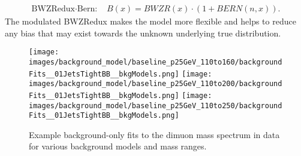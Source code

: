 \begin{align}
        \label{eq:BWZReduxPoly}
        \text{BWZRedux}\cdot\text{Bern: }& {B(x)} = BWZR(x) \cdot \left(1+ BERN(n,x)\right).
\end{align}
The modulated BWZRedux makes the model more flexible and helps to reduce any bias that may exist towards the unknown underlying true distribution.
\begin{figure}[hbp]
     \centering
     \texttt{[image: images/background\_model/baseline\_p25GeV\_110to160/backgroundFits\_\_01JetsTightBB\_\_bkgModels.png]}
     \texttt{[image: images/background\_model/baseline\_p25GeV\_110to200/backgroundFits\_\_01JetsTightBB\_\_bkgModels.png]}
     \texttt{[image: images/background\_model/baseline\_p25GeV\_110to250/backgroundFits\_\_01JetsTightBB\_\_bkgModels.png]}
     \caption[Some background-only fits.]
     {Example background-only fits to the dimuon mass spectrum in data for various background models and mass ranges.}
     \label{bkgmodel:exampleModels}
\end{figure}

